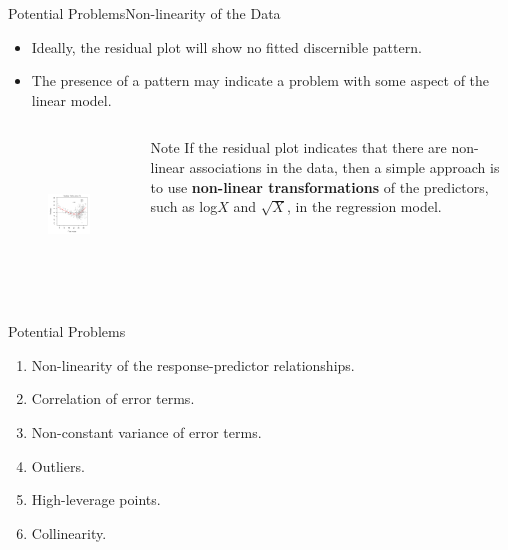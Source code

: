 \begin{frame}{Potential Problems}{Non-linearity of the Data}

\begin{itemize}
    \item Ideally, the residual plot will show no fitted discernible pattern. \pause

    \item The presence of a pattern may indicate a problem with some aspect of the linear model. \pause
\end{itemize}

\begin{columns}

    \begin{figure}[!h]
        \centering
        \includegraphics[height=4cm, width=4cm]{other-lr/residual_fit.png}
    \end{figure} \pause


    \begin{block}{Note}
    If the residual plot indicates that there are non-linear associations in the data, then a simple approach is to use \textbf{non-linear transformations} of the predictors, such as log$X$ and $\sqrt{X}$, in the regression model. 
    \end{block}
    
    
\end{columns}
    
\end{frame}    


\begin{frame}[noframenumbering]{Potential Problems}


\begin{enumerate}
    \item<1> Non-linearity of the response-predictor relationships.
    \item<1-2> Correlation of error terms.
    \item<1> Non-constant variance of error terms.
    \item<1> Outliers.
    \item<1> High-leverage points.
    \item<1> Collinearity.
\end{enumerate}
    
\end{frame}

